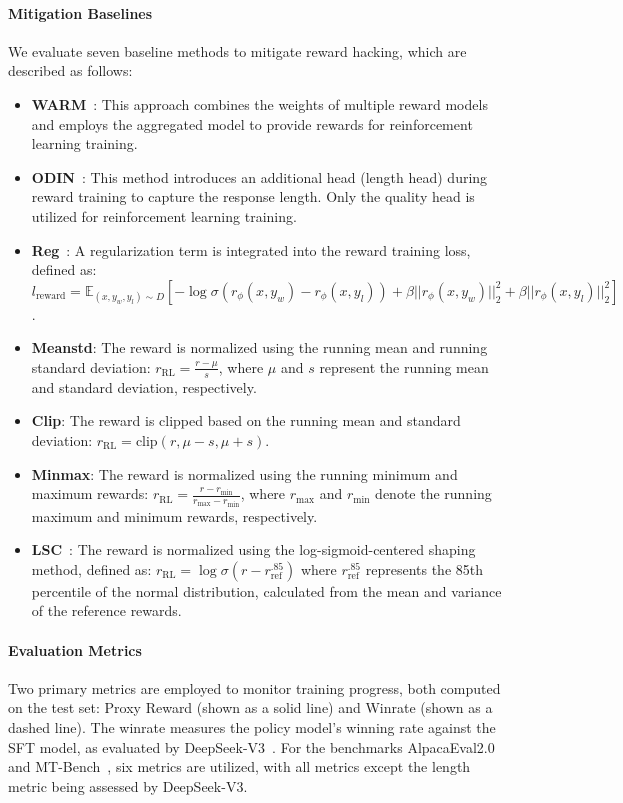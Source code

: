 \paragraph{Mitigation Baselines}
We evaluate seven baseline methods to mitigate reward hacking, which are described as follows:
\begin{itemize}[leftmargin=*, itemsep=0pt]
\item \textbf{WARM}~\cite{Rame2024WARMOT}: This approach combines the weights of multiple reward models and employs the aggregated model to provide rewards for reinforcement learning training.
\item \textbf{ODIN}~\cite{Chen2024ODINDR}: This method introduces an additional head (length head) during reward training to capture the response length. Only the quality head is utilized for reinforcement learning training.
\item \textbf{Reg}~\cite{Dai2023SafeRS}: A regularization term is integrated into the reward training loss, defined as:
$l_{\text{reward}}=\mathbb{E}_{(x,y_w,y_l)\sim D}[-\log \sigma(r_{\phi}(x,y_w)-r_{\phi}(x,y_l))+\beta ||r_{\phi}(x,y_w)||_2^2+\beta ||r_{\phi}(x,y_l)||_2^2]$.
\item \textbf{Meanstd}: The reward is normalized using the running mean and running standard deviation:
$r_{\text{RL}} = \frac{r - \mu}{s}$,
where \( \mu \) and \( s \) represent the running mean and standard deviation, respectively.
\item \textbf{Clip}: The reward is clipped based on the running mean and standard deviation:
$r_{\text{RL}} = \text{clip}(r, \mu - s, \mu + s)$.
\item \textbf{Minmax}: The reward is normalized using the running minimum and maximum rewards:
$r_{\text{RL}} = \frac{r - r_{\min}}{r_{\max} - r_{\min}}$,
where \( r_{\max} \) and \( r_{\min} \) denote the running maximum and minimum rewards, respectively.
\item \textbf{LSC}~\cite{Wang2024TransformingAC}: The reward is normalized using the log-sigmoid-centered shaping method, defined as: $r_{\text{RL}} = \log\sigma(r - r_{\text{ref}}^{.85})$
where \( r_{\text{ref}}^{.85} \) represents the 85th percentile of the normal distribution, calculated from the mean and variance of the reference rewards.
\end{itemize}

\paragraph{Evaluation Metrics}
Two primary metrics are employed to monitor training progress, both computed on the test set: Proxy Reward (shown as a solid line) and Winrate (shown as a dashed line). The winrate measures the policy model's winning rate against the SFT model, as evaluated by DeepSeek-V3~\cite{deepseekai2024deepseekv3technicalreport}. For the benchmarks AlpacaEval2.0~\cite{alpaca_eval} and MT-Bench~\cite{zheng2023judgingllmasajudgemtbenchchatbot}, six metrics are utilized, with all metrics except the length metric being assessed by DeepSeek-V3.
